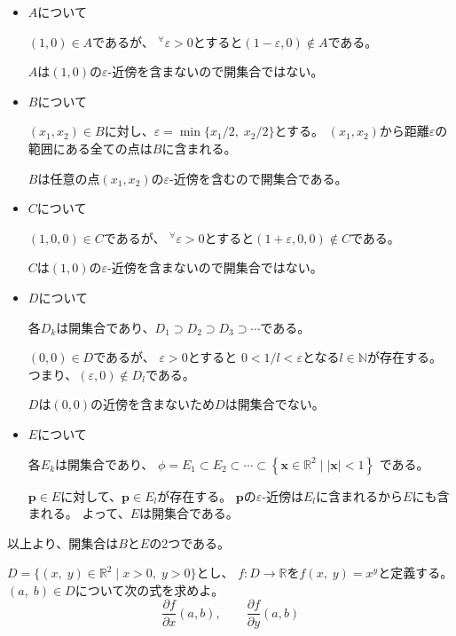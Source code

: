 \documentclass[12pt,b5paper]{ltjsarticle}
\begin{document}
\begin{itemize}
 \item $A$について

       $(1,0)\in A$であるが、
       ${}^{\forall}\varepsilon>0$とすると$(1-\varepsilon,0)\not\in A$である。

       $A$は$(1,0)$の$\varepsilon$-近傍を含まないので開集合ではない。

 \item $B$について

       $(x_1,x_2)\in B$に対し、$\varepsilon=\min\{x_1/2,\;x_2/2\}$とする。
       $(x_1,x_2)$から距離$\varepsilon$の範囲にある全ての点は$B$に含まれる。

       $B$は任意の点$(x_1,x_2)$の$\varepsilon$-近傍を含むので開集合である。

 \item $C$について

       $(1,0,0)\in C$であるが、
       ${}^{\forall}\varepsilon>0$とすると$(1+\varepsilon,0,0)\not\in C$である。

       $C$は$(1,0)$の$\varepsilon$-近傍を含まないので開集合ではない。

 \item $D$について

       各$D_k$は開集合であり、$D_1 \supset D_2 \supset D_3 \supset \cdots$である。

       $(0,0)\in D$であるが、
       $\varepsilon>0$とすると
       $0< 1/l < \varepsilon$となる$l\in\mathbb{N}$が存在する。
       つまり、$(\varepsilon,0)\not\in D_l$である。

       $D$は$(0,0)$の近傍を含まないため$D$は開集合でない。

 \item $E$について

       各$E_k$は開集合であり、
       $\phi=E_1\subset E_2\subset \cdots \subset \left\{\bm{x}\in\mathbb{R}^2 \mid
   \lvert \bm{x} \rvert < 1 \right\}$
       である。

       $\bm{p}\in E$に対して、$\bm{p}\in E_l$が存在する。
       $\bm{p}$の$\varepsilon$-近傍は$E_l$に含まれるから$E$にも含まれる。
       よって、$E$は開集合である。
\end{itemize}

以上より、開集合は$B$と$E$の2つである。

\dotfill


$D= \{(x,\;y)\in\mathbb{R}^2 \mid x>0,\; y>0\}$とし、
$f: D\rightarrow\mathbb{R}$を$f(x,\;y)=x^y$と定義する。
$(a,\;b)\in D$について次の式を求めよ。
\begin{equation}
 \frac{\partial f}{\partial x}(a,b), \qquad \frac{\partial f}{\partial y}(a,b)
\end{equation}
\end{document}
